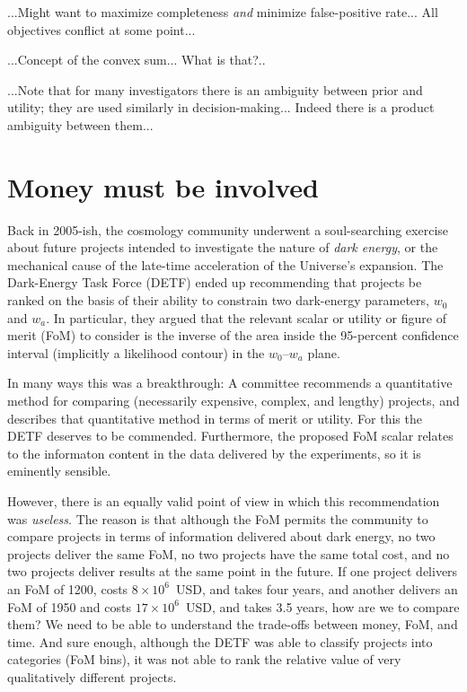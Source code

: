 \documentclass[12pt,twoside,pdftex]{article}
\begin{document}
...Might want to maximize completeness \emph{and} minimize
false-positive rate... All objectives conflict at some point...

...Concept of the convex sum... What is that?..

...Note that for many investigators there is an ambiguity between
prior and utility; they are used similarly in
decision-making... Indeed there is a product ambiguity between them...

\section{Money must be involved}


Back in 2005-ish, the cosmology community underwent a soul-searching
exercise about future projects intended to investigate the nature of
\emph{dark energy}, or the mechanical cause of the late-time
acceleration of the Universe's expansion.  The Dark-Energy Task
Force (DETF) ended up recommending that projects be ranked on the
basis of their ability to constrain two dark-energy parameters, $w_0$
and $w_a$.  In particular, they argued that the relevant scalar or
utility or figure of merit (FoM) to consider is the inverse of the
area inside the 95-percent confidence interval (implicitly a
likelihood contour) in the $w_0$--$w_a$ plane.

In many ways this was a breakthrough: A committee recommends a
quantitative method for comparing (necessarily expensive, complex, and
lengthy) projects, and describes that quantitative method in terms of
merit or utility.  For this the DETF deserves to be commended.
Furthermore, the proposed FoM scalar relates to the informaton content
in the data delivered by the experiments, so it is eminently sensible.

However, there is an equally valid point of view in which this
recommendation was \emph{useless}.  The reason is that although the
FoM permits the community to compare projects in terms of information
delivered about dark energy, no two projects deliver the same FoM, no
two projects have the same total cost, and no two projects deliver
results at the same point in the future.  If one project delivers an
FoM of 1200, costs $8\times 10^6$~USD, and takes four years, and
another delivers an FoM of 1950 and costs $17\times 10^6$~USD, and
takes 3.5 years, how are we to compare them?  We need to be able to
understand the trade-offs between money, FoM, and time.  And sure
enough, although the DETF was able to classify projects into
categories (FoM bins), it was not able to rank the relative value of
very qualitatively different projects.
\end{document}
